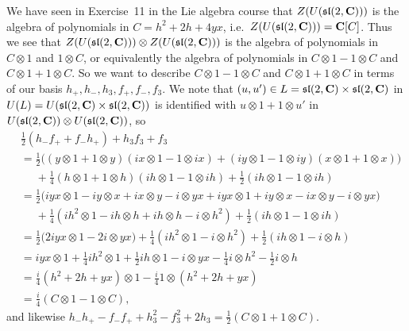 We have seen in Exercise~11 in the Lie algebra course  that $Z(U(\mathfrak{sl}(2,\mathbf{C})))$ is the algebra of polynomials in $C=h^2+2h+4yx$, i.e.\ $Z(U(\mathfrak{sl}(2,\mathbf{C})))=\mathbf{C}[C]$. Thus we see that $Z(U(\mathfrak{sl}(2,\mathbf{C})))\otimes Z(U(\mathfrak{sl}(2,\mathbf{C})))$ is the algebra of polynomials in $C\otimes 1$ and $1\otimes C$, or equivalently the algebra of polynomials in $C\otimes 1 - 1\otimes C$ and $C\otimes 1 + 1\otimes C$. So we want to describe $C\otimes 1 - 1\otimes C$ and $C\otimes 1 + 1\otimes C$ in terms of our basis $h_+,h_-,h_3,f_+,f_-,f_3$. We note that $(u,u')\in L=\mathfrak{sl}(2,\mathbf{C})\times \mathfrak{sl}(2,\mathbf{C})$ in $U(L)=U(\mathfrak{sl}(2,\mathbf{C})\times \mathfrak{sl}(2,\mathbf{C}))$ is identified with $u\otimes 1 + 1\otimes u'$ in $U(\mathfrak{sl}(2,\mathbf{C}))\otimes U(\mathfrak{sl}(2,\mathbf{C}))$, so 
\begin{align*}
  &\tfrac{1}{2}(h_-f_++f_-h_+)+h_3f_3+f_3\\
  &= \tfrac{1}{2}\bigl( (y\otimes 1 + 1\otimes y)(ix\otimes 1 - 1\otimes ix) + (iy\otimes 1 - 1\otimes iy)(x\otimes 1 + 1\otimes x) \bigr) \\
  &\phantom{{}={}}{} + \tfrac{1}{4}(h\otimes 1+ 1\otimes h)(ih\otimes 1- 1\otimes ih) + \tfrac{1}{2}(ih\otimes 1- 1\otimes ih) \\
  &= \tfrac{1}{2}\bigl( iyx\otimes 1 - iy\otimes x + ix\otimes y - i\otimes yx + iyx\otimes 1 + iy\otimes x - ix\otimes y - i\otimes yx \bigr) \\
  &\phantom{{}={}}{} + \tfrac{1}{4}(ih^2\otimes 1 - ih\otimes h + ih\otimes h - i\otimes h^2) + \tfrac{1}{2}(ih\otimes 1- 1\otimes ih) \\
  &= \tfrac{1}{2}\bigl( 2iyx\otimes 1 - 2i\otimes yx \bigr) + \tfrac{1}{4}(ih^2\otimes 1 - i\otimes h^2) + \tfrac{1}{2}(ih\otimes 1- i\otimes h) \\
  &= iyx\otimes 1 + \tfrac{1}{4}ih^2\otimes 1 + \tfrac{1}{2}ih\otimes 1 - i\otimes yx - \tfrac{1}{4}i\otimes h^2 - \tfrac{1}{2}i\otimes h \\
  &= \tfrac{i}{4}(h^2+2h+yx)\otimes 1 - \tfrac{i}{4}1\otimes (h^2+2h+yx) \\
  &= \tfrac{i}{4}(C\otimes 1 - 1\otimes C),
\end{align*}
and likewise $h_-h_+ - f_-f_+ + h_3^2 - f_3^2 + 2h_3 = \tfrac{1}{2}(C\otimes 1 + 1\otimes C)$.

